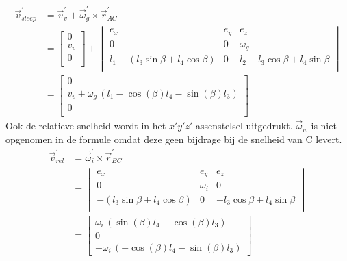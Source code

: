 \begin{equation}
\begin{split}
\vec{v}_{sleep}^{'}&=\vec{v}_{v}^{'}+\vec{\omega}_{g}^{'}\times\vec{r}_{AC}^{'}\\
&=\begin{bmatrix}
0						\\
v_{v}	\\
0						\\
\end{bmatrix}
+\begin{vmatrix}
e_{x}&e_{y}&e_{z}\\
0&0&\omega_{g}\\
l_{1}-(l_{3}\sin{\beta}+l_{4}\cos{\beta})&0&l_{2}-l_{3}\cos{\beta}+l_{4}\sin{\beta}\\
\end{vmatrix}\\
&=\begin{bmatrix}
0						\\
v_{v}+\omega_{g}\,\left( l_{1}-\cos \left( \beta \right) l_{4}-\sin \left( \beta \right) l_{3} \right)\\
0						\\
\end{bmatrix}
\end{split}
\label{eq:kin2.6}
\end{equation}
Ook de relatieve snelheid wordt in het $x'y'z'$-assenstelsel uitgedrukt. $\vec{\omega}_{w}$ is niet opgenomen in de formule omdat deze geen bijdrage bij de snelheid van C levert.
\begin{equation}
\begin{split}
\vec{v}_{rel}^{'}&=\vec{\omega}_{i}^{'}\times\vec{r}_{BC}^{'}\\
&=\begin{vmatrix}
e_{x}&e_{y}&e_{z}\\
0&\omega_{i}&0\\
-(l_{3}\sin{\beta}+l_{4}\cos{\beta})&0&-l_{3}\cos{\beta}+l_{4}\sin{\beta}\\
\end{vmatrix}\\
&=\left[ \begin {array}{c} \omega_{i}\, \left( \sin \left( \beta
 \right) l_{4}-\cos \left( \beta \right) l_{3} \right)\\ 0\\-\omega_{i}\, \left( -\cos \left( \beta \right) l_{4}-\sin \left( \beta \right) l_{3} \right)\end {array} \right]
\end{split}
\label{eq:kin2.7}
\end{equation}
